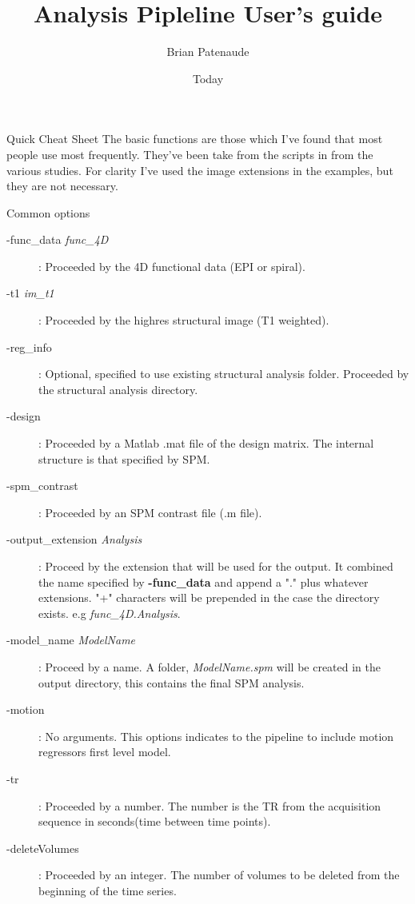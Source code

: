 \documentclass[]{article}
\begin{document}
\title{Analysis Pipleline User's guide}
\author{Brian Patenaude}
\date{Today}
\maketitle

\begin{section}{Quick Cheat Sheet}
The basic functions are those which I've found that most people use most frequently. They've been take from the scripts in from the various studies. For clarity I've used the image extensions in the examples, but they are not necessary.
\begin{subsection}{Common options}
\begin{description}
	\item [-func\_data {\it func\_4D}] :  Proceeded by the 4D functional data (EPI or spiral).
	\item [ -t1 {\it im\_t1}]  : Proceeded by the highres structural image (T1 weighted). 
	\item [-reg\_info] : Optional, specified to use existing structural analysis folder. Proceeded by the structural analysis directory.
	\item [-design] : Proceeded by a Matlab .mat file of the design matrix. The internal structure is that specified by SPM.
	\item [-spm\_contrast] : Proceeded by an SPM contrast file (.m file).
	\item [-output\_extension {\it Analysis}] : Proceed by the extension that will be used for the output. It combined the name  
						\hspace*{1cm} specified by {\bf -func\_data} and append a "." plus whatever extensions. "+"  characters will be prepended in the case 
						\hspace*{1cm} the directory exists. e.g {\it func\_4D.Analysis}.
	\item[-model\_name {\it ModelName}] : Proceed by a name. A folder, {\it ModelName.spm} will be created in the output directory, this contains the final SPM analysis.
	\item[-motion] : No arguments. This options indicates to the pipeline to include motion regressors first level model.
	\item[-tr] : Proceeded by a number. The number is the TR from the acquisition sequence in seconds(time between time points).
	\item[-deleteVolumes] : Proceeded by an integer. The number of volumes to be deleted from the beginning of the time series.

\end{description}
\end{subsection}
\end{section}
\end{document}
